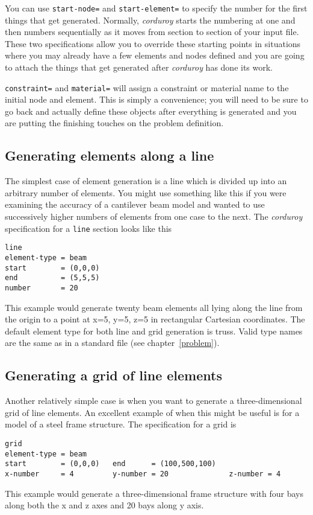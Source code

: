 You can use {\tt start-node=} and {\tt start-element=} to specify the number
for the first things that get generated.  Normally, {\em corduroy} starts
the numbering at one and then numbers sequentially as it moves from section
to section of your input file.  These two specifications allow you to override
these starting points in situations where you may already have a few elements
and nodes defined and you are going to attach the things that get generated
after {\em corduroy} has done its work.

{\tt constraint=} and {\tt material=} will assign a constraint or material
name to the initial node and element.  This is simply a convenience; you will
need to be sure to go back and actually define these objects after everything
is generated and you are putting the finishing touches on the problem 
definition.

\subsection{Generating elements along a line}

The simplest case of element generation is a line which is divided up into
an arbitrary number of elements.  You might use something like this if you
were examining the accuracy of a cantilever beam model and wanted to use
successively higher numbers of elements from one case to the next.  The
{\em corduroy} specification for a {\tt line} section looks like this
\begin{screen}
 \begin{verbatim}
line
element-type = beam
start        = (0,0,0)    
end          = (5,5,5)    
number       = 20
 \end{verbatim}
\end{screen}
This example would generate twenty beam elements all lying along the line from
the origin to a point at x=5, y=5, z=5 in rectangular Cartesian coordinates.
The default element type for both line and grid generation is truss.  Valid
type names are the same as in a standard \felt{} file (see 
chapter~\ref{problem}).

\subsection{Generating a grid of line elements}

Another relatively simple case is when you want to generate a three-dimensional
grid of line elements. An excellent example of when this might be useful is
for a model of a steel frame structure. The specification for a grid is
\begin{screen}
 \begin{verbatim}
grid
element-type = beam
start        = (0,0,0)   end      = (100,500,100)
x-number     = 4         y-number = 20              z-number = 4
 \end{verbatim}
\end{screen}
This example would generate a three-dimensional frame structure with four
bays along both the x and z axes and 20 bays along y axis.

